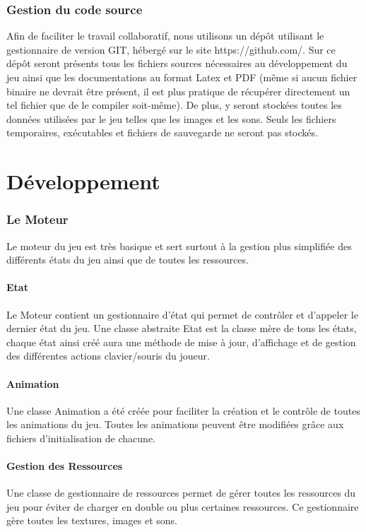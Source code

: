 \documentclass[a4paper]{article}
\newcommand{\alinea}{\hspace*{0.5cm}}
\begin{document}
    \section{Gestion du code source}
      \alinea Afin de faciliter le travail collaboratif, nous utilisons un dépôt utilisant le gestionnaire de version GIT, hébergé sur le site https://github.com/. Sur ce dépôt seront présents tous les fichiers sources nécessaires au développement du jeu ainsi que les documentations au format Latex et PDF (même si aucun fichier binaire ne devrait être présent, il est plus pratique de récupérer directement un tel fichier que de le compiler soit-même). De plus, y seront stockées toutes les données utilisées par le jeu telles que les images et les sons. Seuls les fichiers temporaires, exécutables et fichiers de sauvegarde ne seront pas stockés.
		
\newpage
  \part{Développement}
    \section{Le Moteur}
      \alinea Le moteur du jeu est très basique et sert surtout à la gestion plus simplifiée des différents états du jeu ainsi que de toutes les ressources.
      
      \subsection{Etat}
        \alinea Le Moteur contient un gestionnaire d'état qui permet de contrôler et d'appeler le dernier état du jeu. Une classe abstraite Etat est la classe mère de tous les états, chaque état ainsi créé aura une méthode de mise à jour, d'affichage et de gestion des différentes actions clavier/souris du joueur.
        
      \subsection{Animation}
        \alinea Une classe Animation a été créée pour faciliter la création et le contrôle de toutes les animations du jeu. Toutes les animations peuvent être modifiées grâce aux fichiers d'initialisation de chacune.
        
      \subsection{Gestion des Ressources}
        \alinea Une classe de gestionnaire de ressources permet de gérer toutes les ressources du jeu pour éviter de charger en double ou plus certaines ressources. Ce gestionnaire gère toutes les textures, images et sons.
\end{document}
